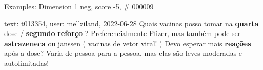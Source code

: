 \begin{frame}{Examples: Dimension 1 neg, score -5, \# 000009}
\footnotesize
\begin{alertblock}{text: t013354, user: mellziland, 2022-06-28}
Quais vacinas posso tomar na \textbf{quarta} dose / \textbf{segundo} 
\textbf{reforço} ?  Preferencialmente Pfizer, mas 
também pode ser \textbf{astrazeneca} ou janssen ( vacinas de vetor viral! ) 
Devo esperar mais \textbf{reações} após a dose?  
Varia de pessoa para a pessoa, mas elas são leves-moderadas e autolimitadas! 
\end{alertblock}
\end{frame}
